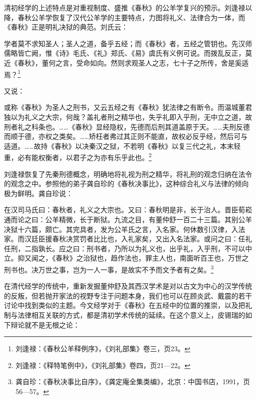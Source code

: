 \documentclass[a4paper, 12pt, openright]{ctexbook}
\renewenvironment{quote}
  {\list{}{\rightmargin2\ccwd \leftmargin2\ccwd \itemindent=2\ccwd \listparindent=2\ccwd}%
   \item\relax\small\kaishu\color{black}}
  {\endlist}
\begin{document}
清初经学的上述特点是对重视制度、盛推《春秋》的公羊学复兴的预示。刘逢禄以降，春秋公羊学恢复了汉代公羊学的主要特点，力图将礼义、法律合为一体，而《春秋》正是明礼决狱的典范。刘氏云：

\begin{quote}
学者莫不求知圣人；圣人之道，备乎五经；而《春秋》者，五经之管钥也。先汉师儒略皆亡阙，惟《诗》毛氏、《礼》郑氏、《易》虞氏有义例可说。而拨乱反正，莫近《春秋》，董何之言，受命如向。然则求观圣人之志，七十子之所传，舍是奚适焉？\footnote{刘逢禄：《春秋公羊释例序》，《刘礼部集》卷三，页23。}
\end{quote}

又说：

\begin{quote}
或称《春秋》为圣人之刑书，又云五经之有《春秋》犹法律之有断令。而温城董君独以为礼义之大宗，何哉？盖礼者刑之精华也，失乎礼即入乎刑，无中立之道，故刑者礼之科条也。……《春秋》显经隐权，先德而后刑其道盖原于天。……夫刑反德而顺于德，亦权之类矣。……矫枉者弗过其正则不能直，故权必反乎经，然后可与适道。……故持《春秋》以决秦汉之狱，不若明《春秋》以复三代之礼，本末轻重，必有能权衡者，以君子之为亦有乐乎此也。\footnote{刘逢禄：《释特笔例中》，《刘礼部集》卷四，页21—22。}
\end{quote}

刘逢禄恢复了先秦刑德概念，明确地将礼视为刑之精华，将礼刑的观念归纳在法令的观念之中。参照他的弟子龚自珍的《春秋决事比》，这种综合礼义与法律的倾向极为鲜明。龚自珍说：

\begin{quote}
在汉司马氏曰：春秋者，礼义之大宗也。又曰：春秋明是非，长于治人。晋臣荀崧通而论之曰：公羊精微，长于断狱。九流之目，有董仲舒一百二十三篇。其别公羊决狱十六篇，颇亡。其完具者，发为公羊氏之言，入名家。何休数引汉律，入法家。而汉廷臣援春秋决赏罚者比比也，入礼家矣，又出入名法家。或问之曰：任礼任刑，二指孰长。应之曰：刑书者，乃所以为礼义也，出乎礼，入乎刑，不可以中立。抑又闻之，《春秋》之治狱也，趋作法也，罪主人也，南面听百王也，万世之刑书也。决万世之事，岂为一人一事，是故实不予而文予者有之矣。\footnote{龚自珍：《春秋决事比自序》，《龚定庵全集类编》，北京：中国书店，1991，页56—57。}
\end{quote}

在清代经学的传统中，重新发掘董仲舒及其西汉学术是对以古文为中心的汉学传统的反叛，但若抛开家法的视野专注于问题本身，我们也可以在顾炎武、戴震的若干讨论中找到类似的主题。今文经学对于《春秋》在五经中的位置的推崇，以及把礼制与法律相互关联的方式，都是清初学术传统的延续。在这个意义上，皮锡瑞的如下辩论就不是无根之论：
\end{document}
